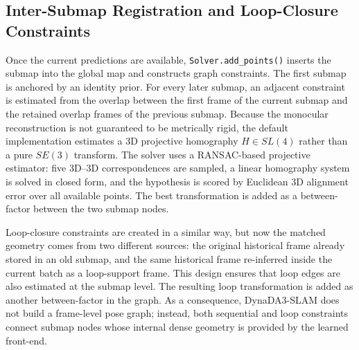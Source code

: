 \subsection{Inter-Submap Registration and Loop-Closure Constraints}
Once the current predictions are available, \texttt{Solver.add\_points()} inserts the submap into the global map and constructs graph constraints. The first submap is anchored by an identity prior. For every later submap, an adjacent constraint is estimated from the overlap between the first frame of the current submap and the retained overlap frames of the previous submap. Because the monocular reconstruction is not guaranteed to be metrically rigid, the default implementation estimates a 3D projective homography $H \in SL(4)$ rather than a pure $SE(3)$ transform. The solver uses a RANSAC-based projective estimator: five 3D--3D correspondences are sampled, a linear homography system is solved in closed form, and the hypothesis is scored by Euclidean 3D alignment error over all available points. The best transformation is added as a between-factor between the two submap nodes.

Loop-closure constraints are created in a similar way, but now the matched geometry comes from two different sources: the original historical frame already stored in an old submap, and the same historical frame re-inferred inside the current batch as a loop-support frame. This design ensures that loop edges are also estimated at the submap level. The resulting loop transformation is added as another between-factor in the graph. As a consequence, DynaDA3-SLAM does not build a frame-level pose graph; instead, both sequential and loop constraints connect submap nodes whose internal dense geometry is provided by the learned front-end.

